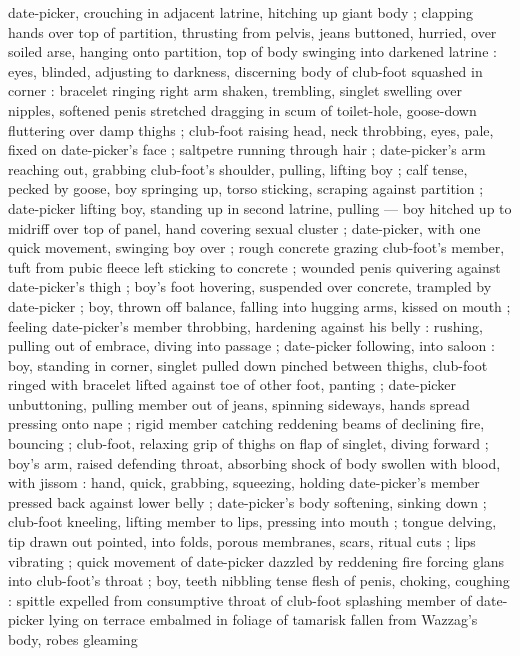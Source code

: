 date-picker, crouching in adjacent latrine, hitching up giant body ; clapping hands over top of
partition, thrusting from pelvis, jeans buttoned, hurried, over soiled arse, hanging onto partition,
top of body swinging into darkened latrine : eyes, blinded, adjusting to darkness, discerning body
of club-foot squashed in corner : bracelet ringing right arm shaken, trembling, singlet swelling
over nipples, softened penis stretched dragging in scum of toilet-hole, goose-down fluttering over
damp thighs ; club-foot raising head, neck throbbing, eyes, pale, fixed on date-picker's face ;
saltpetre running through hair ; date-picker's arm reaching out, grabbing club-foot's shoulder,
pulling, lifting boy ; calf tense, pecked by goose, boy springing up, torso sticking, scraping
against partition ; date-picker lifting boy, standing up in second latrine, pulling --- boy hitched
up to midriff over top of panel, hand covering sexual cluster ; date-picker, with one quick
movement, swinging boy over ; rough concrete grazing club-foot's member, tuft from pubic fleece left
sticking to concrete ; wounded penis quivering against date-picker's thigh ; %
boy's foot hovering, suspended over concrete, trampled by date-picker ; boy, thrown off balance,
falling into hugging arms, kissed on mouth ; feeling date-picker's member throbbing, hardening
against his belly : rushing, pulling out of embrace, diving into passage ; date-picker following,
into saloon : boy, standing in corner, singlet pulled down pinched between thighs, club-foot ringed
with bracelet lifted against toe of other foot, panting ; date-picker unbuttoning, pulling member
out of jeans, spinning sideways, hands spread pressing onto nape ; rigid member catching reddening
beams of declining fire, bouncing ; club-foot, relaxing grip of thighs on flap of singlet, diving
forward ; boy's arm, raised defending throat, absorbing shock of body swollen with blood, with
jissom : hand, quick, grabbing, squeezing, holding date-picker's member pressed back against lower
belly ; date-picker's body softening, sinking down ; club-foot kneeling, lifting member to lips,
pressing into mouth ; tongue delving, tip drawn out pointed, into folds, porous membranes, scars,
ritual cuts ; lips vibrating ; quick movement of date-picker dazzled by reddening fire forcing glans
into club-foot's throat ; boy, teeth nibbling tense flesh of penis, choking, coughing : spittle
expelled from consumptive throat of club-foot splashing member of date-picker {\semislash}
{\dt}lying on terrace embalmed in foliage of tamarisk fallen from Wazzag's body, robes gleaming
